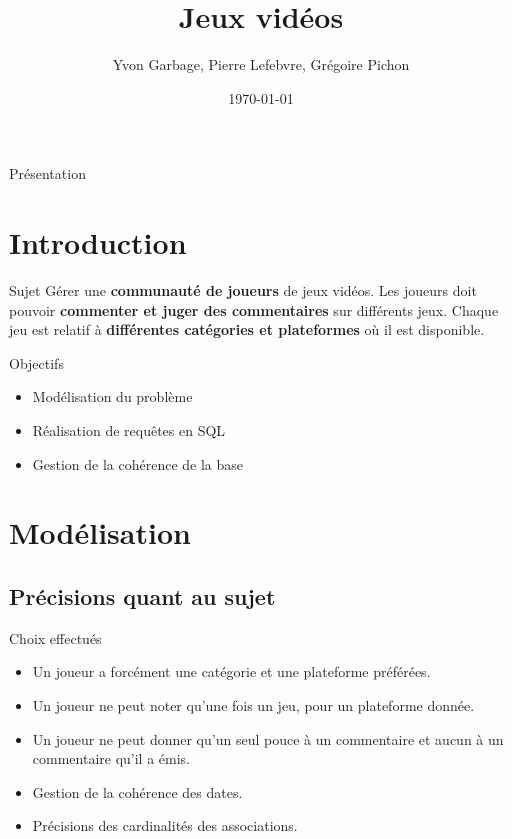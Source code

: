 \documentclass{beamer}
\title[Projet de SGBD]{Jeux vidéos}
\author[Les Manchots]{Yvon Garbage, Pierre Lefebvre, Grégoire Pichon}
\institute[ENSEIRB-MATMECA]{ENSEIRB-MATMECA}
\date{\today}
\begin{document}
\setlength{\unitlength}{1cm}

\begin{frame}{Présentation}

\titlepage

\end{frame}

\section*{Introduction}
\begin{frame}
\begin{block}{Sujet}
Gérer une \textbf{communauté de joueurs} de jeux vidéos. Les joueurs doit pouvoir \textbf{commenter et juger des commentaires} sur différents jeux. Chaque jeu est relatif à \textbf{différentes catégories et plateformes} où il est disponible.

\end{block}

\begin{block}{Objectifs}
\begin{center}
\begin{itemize}
  \item{Modélisation du problème}
  \item{Réalisation de requêtes en SQL}
  \item{Gestion de la cohérence de la base}
\end{itemize}
\end{center}
\end{block}
\end{frame}

\section{Modélisation}
\subsection{Précisions quant au sujet}
\begin{frame}
\begin{block}{Choix effectués}
\begin{center}
\begin{itemize}
\item Un joueur a forcément une catégorie et une plateforme préférées.
\item Un joueur ne peut noter qu'une fois un jeu, pour un plateforme donnée.
\item Un joueur ne peut donner qu'un seul pouce à un commentaire et aucun à un commentaire qu'il a émis.
\item Gestion de la cohérence des dates.
\item Précisions des cardinalités des associations.
\end{itemize}
\end{center}
\end{block}
\end{frame}
\end{document}
